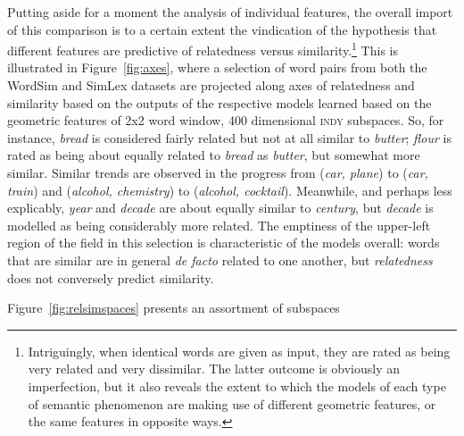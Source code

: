 Putting aside for a moment the analysis of individual features, the overall import of this comparison is to a certain extent the vindication of the hypothesis that different features are predictive of relatedness versus similarity.\footnote{Intriguingly, when identical words are given as input, they are rated as being very related and very dissimilar.  The latter outcome is obviously an imperfection, but it also reveals the extent to which the models of each type of semantic phenomenon are making use of different geometric features, or the same features in opposite ways.}  This is illustrated in Figure~\ref{fig:axes}, where a selection of word pairs from both the WordSim and SimLex datasets are projected along axes of relatedness and similarity based on the outputs of the respective models learned based on the geometric features of 2x2 word window, 400 dimensional \textsc{indy} subspaces.  So, for instance, \emph{bread} is considered fairly related but not at all similar to \emph{butter}; \emph{flour} is rated as being about equally related to \emph{bread} as \emph{butter}, but somewhat more similar.  Similar trends are observed in the progress from (\emph{car, plane}) to (\emph{car, train}) and (\emph{alcohol, chemistry}) to (\emph{alcohol, cocktail}).  Meanwhile, and perhaps less explicably, \emph{year} and \emph{decade} are about equally similar to \emph{century}, but \emph{decade} is modelled as being considerably more related.  The emptiness of the upper-left region of the field in this selection is characteristic of the models overall: words that are similar are in general \emph{de facto} related to one another, but \emph{relatedness} does not conversely predict similarity.

Figure~\ref{fig:relsimspaces} presents an assortment of subspaces

